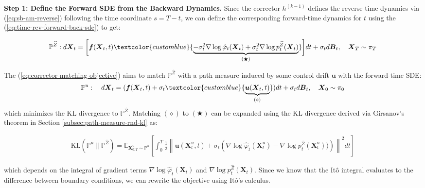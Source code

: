\documentclass{article}
\newcommand{\bluetext}[1]{\textcolor{customblue}{#1}}
\begin{document}
\textbf{Step 1: Define the Forward SDE from the Backward Dynamics. }
Since the corrector $h^{(k-1)}$ defines the reverse-time dynamics via (\ref{eq:sb-am-reverse}) following the time coordinate $s=T-t$, we can define the corresponding forward-time dynamics for $t$ using the (\ref{eq:time-rev-forward-back-sde}) to get:
\begin{small}
\begin{align}
    \mathbb{P}^{\widehat{Z}}:d\boldsymbol{X}_t=\bigg[\boldsymbol{f}(\boldsymbol{X}_t,t)\bluetext{\underbrace{-\sigma_t^2\nabla \log \hat{\varphi}_t(\boldsymbol{X}_t)+\sigma^2_t\nabla \log p_t^{\widehat{Z}}(\boldsymbol{X}_t)}_{(\bigstar)}}\bigg]dt + \sigma_td\boldsymbol{B}_t, \quad \boldsymbol{X}_T\sim \pi_T\label{eq:sb-am-fwd-proof1}
\end{align}
\end{small}
The (\ref{eq:corrector-matching-objective}) aims to match $\mathbb{P}^{\widehat{Z}}$ with a path measure induced by some control drift $\boldsymbol{u}$ with the forward-time SDE:
\begin{align}
    \mathbb{P}^u:\quad d\boldsymbol{X}_t=(\boldsymbol{f}(\boldsymbol{X}_t,t)+\sigma_t\bluetext{\underbrace{\boldsymbol{u}(\boldsymbol{X}_t,t)}_{(\diamond)}})dt+\sigma_td\boldsymbol{B}_t, \quad \boldsymbol{X}_0\sim \pi_0\label{eq:sb-am-fwd-proof2}
\end{align}
which minimizes the KL divergence to $\mathbb{P}^{\widehat{Z}}$. Matching $(\diamond)$ to $(\bigstar)$ can be expanded using the KL divergence derived via Girsanov's theorem in Section \ref{subsec:path-measure-rnd-kl} as:
\begin{small}
\begin{align}
    \text{KL}(\mathbb{P}^u\|\mathbb{P}^{\widehat{Z}})=\mathbb{E}_{\boldsymbol{X}^u_{0:T}\sim \mathbb{P}^u}\left[\int_0^T\frac{1}{2}\left\|\boldsymbol{u}(\boldsymbol{X}^u_t,t)+\sigma_t\left(\nabla \log \hat{\varphi}_t(\boldsymbol{X}^u_t)-\nabla \log p_t^{\widehat{Z}}(\boldsymbol{X}^u_t))\right)\right\|^2dt\right]\label{eq:sb-am-fwd-proof3}
\end{align}
\end{small}
which depends on the integral of gradient terms $\nabla \log \hat{\varphi}_t(\boldsymbol{X}_t)$ and $\nabla \log p_t^{\widehat{Z}}(\boldsymbol{X}_t)$. Since we know that the Itô integral evaluates to the difference between boundary conditions, we can rewrite the objective using Itô's calculus.
\end{document}
